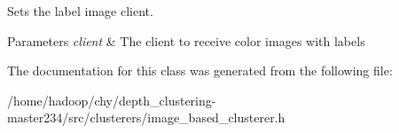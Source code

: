 Sets the label image client. 


\begin{DoxyParams}{Parameters}
{\em client} & The client to receive color images with labels \\
\hline
\end{DoxyParams}


The documentation for this class was generated from the following file\-:\begin{DoxyCompactItemize}
\item 
/home/hadoop/chy/depth\-\_\-clustering-\/master234/src/clusterers/image\-\_\-based\-\_\-clusterer.\-h\end{DoxyCompactItemize}
